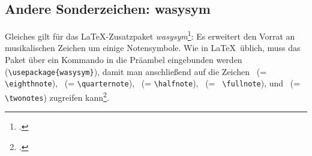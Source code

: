 %
%
%



\subsection{Andere Sonderzeichen: wasysym}

Gleiches gilt für das \LaTeX-Zusatzpaket \textit{wasysym}\footcite[vgl.][\nopage
wp]{CtanWasysym2018a}: Es erweitert den Vorrat an musikalischen Zeichen um
einige Notensymbole. Wie in \LaTeX\ üblich, muss das Paket über ein Kommando in
die Präambel eingebunden werden
(\texttt{\textbackslash{usepackage\{wasysym\}}}), damit man anschließend auf die
Zeichen \eighthnote \ (= \texttt{\small \textbackslash{eighthnote}}),
\quarternote \ (= \texttt{\small \textbackslash{quarternote}}), \halfnote \ (=
\texttt{\small \textbackslash{halfnote}}), \fullnote \ (= \texttt{\small
\textbackslash{fullnote}}), und \twonotes \ (= \texttt{\small
\textbackslash{twonotes}}) zugreifen kann\footcite[vgl.][2]{Kielhorn2003a}.


